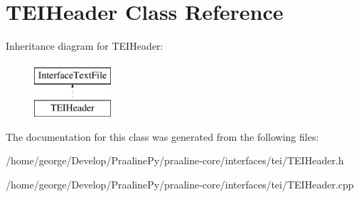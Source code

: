 \hypertarget{class_t_e_i_header}{}\section{T\+E\+I\+Header Class Reference}
\label{class_t_e_i_header}
Inheritance diagram for T\+E\+I\+Header\+:\begin{figure}[H]
\begin{center}
\leavevmode
\includegraphics[height=2.000000cm]{class_t_e_i_header}
\end{center}
\end{figure}


The documentation for this class was generated from the following files\+:\begin{DoxyCompactItemize}
\item 
/home/george/\+Develop/\+Praaline\+Py/praaline-\/core/interfaces/tei/T\+E\+I\+Header.\+h\item 
/home/george/\+Develop/\+Praaline\+Py/praaline-\/core/interfaces/tei/T\+E\+I\+Header.\+cpp\end{DoxyCompactItemize}

